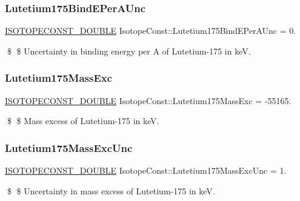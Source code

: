 \subsubsection{\texorpdfstring{Lutetium175\+Bind\+E\+Per\+A\+Unc}{Lutetium175BindEPerAUnc}}
{\footnotesize\ttfamily \mbox{\hyperlink{group___isotope_const-_macros_ga8f45a7272ce02c0b4c65c44636ed719a}{I\+S\+O\+T\+O\+P\+E\+C\+O\+N\+S\+T\+\_\+\+D\+O\+U\+B\+LE}} Isotope\+Const\+::\+Lutetium175\+Bind\+E\+Per\+A\+Unc = 0.}

\$ \$ Uncertainty in binding energy per A of Lutetium-\/175 in keV. \mbox{\label{group___isotope_const-_lutetium-_lu175_ga252c755514ac66a3236f99684e420aa1}} 
\subsubsection{\texorpdfstring{Lutetium175\+Mass\+Exc}{Lutetium175MassExc}}
{\footnotesize\ttfamily \mbox{\hyperlink{group___isotope_const-_macros_ga8f45a7272ce02c0b4c65c44636ed719a}{I\+S\+O\+T\+O\+P\+E\+C\+O\+N\+S\+T\+\_\+\+D\+O\+U\+B\+LE}} Isotope\+Const\+::\+Lutetium175\+Mass\+Exc = -\/55165.}

\$ \$ Mass excess of Lutetium-\/175 in keV. \mbox{\label{group___isotope_const-_lutetium-_lu175_ga30bba88da8e61c384740587c397efc95}} 
\subsubsection{\texorpdfstring{Lutetium175\+Mass\+Exc\+Unc}{Lutetium175MassExcUnc}}
{\footnotesize\ttfamily \mbox{\hyperlink{group___isotope_const-_macros_ga8f45a7272ce02c0b4c65c44636ed719a}{I\+S\+O\+T\+O\+P\+E\+C\+O\+N\+S\+T\+\_\+\+D\+O\+U\+B\+LE}} Isotope\+Const\+::\+Lutetium175\+Mass\+Exc\+Unc = 1.}

\$ \$ Uncertainty in mass excess of Lutetium-\/175 in keV. \mbox{\label{group___isotope_const-_lutetium-_lu175_ga76e624f217df1badbb8f58d0041695fc}} 
